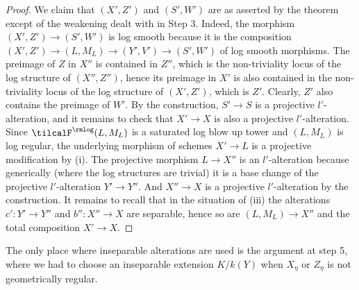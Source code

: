 \documentclass[10pt]{../fichiers-configuration-latex/smfart}
\begin{document}
\begin{proof}
We claim that $(X',Z')$ and $(S',W')$ are as asserted by the theorem except of the
weakening dealt with in Step 3. Indeed, the morphism $(X',Z')\to(S',W')$ is log
smooth because it is the composition $(X',Z')\to (L,M_L)\to(Y',V')\to(S',W')$ of
log smooth morphisms. The preimage of $Z$ in $X''$ is contained in $Z''$, which is
the non-triviality locus of the log structure of $(X'',Z'')$, hence its preimage in
$X'$ is also contained in the non-triviality locus of the log structure of $(X',Z')$,
which is $Z'$. Clearly, $Z'$ also contains the preimage of $W'$. By the construction,
$S'\to S$ is a projective $l'$-alteration, and it remains to check that $X'\to X$ is
also a projective $l'$-alteration. Since $\tilcalF^\rmlog(L,M_L)$ is a saturated log
blow up tower and $(L,M_L)$ is log regular, the underlying morphism of schemes $X'\to L$
is a projective modification by (i). The projective morphism
$L\to X''$ is an $l'$-alteration because generically (where the log structures are trivial)
it is a base change of the projective $l'$-alteration $Y'\to Y''$. And $X''\to X$ is
a projective $l'$-alteration by the construction. It remains to recall that in the
situation of (iii) the alterations $c'{\colon}Y'\to Y''$ and $b''{\colon}X''\to X$
are separable, hence so are $(L,M_L)\to X''$ and the total composition $X'\to X$.
\end{proof}

\begin{remark2}
The only place where inseparable alterations are used is the argument at step 5,
where we had to choose an inseparable extension $K/k(Y)$ when $X_\eta$ or $Z_\eta$
is not geometrically regular.
\end{remark2}
\end{document}
